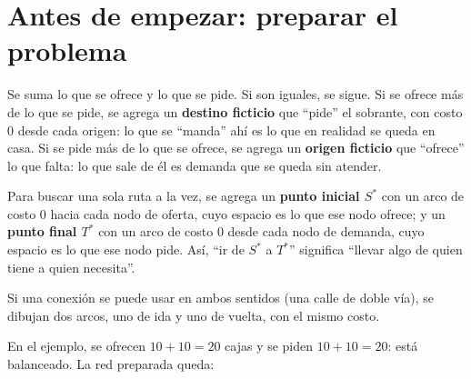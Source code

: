 \documentclass[11pt,a4paper]{article}
\newcommand{\Sini}{\ensuremath{S^{*}}}
\newcommand{\Tfin}{\ensuremath{T^{*}}}
\begin{document}
\section{Antes de empezar: preparar el problema}

\begin{description}[leftmargin=0pt, itemsep=5pt]
  \item[Revisar si está balanceado.] Se suma lo que se ofrece y lo que se pide. Si son iguales, se sigue.
        Si se ofrece más de lo que se pide, se agrega un \textbf{destino ficticio} que ``pide'' el sobrante, con costo 0
        desde cada origen: lo que se ``manda'' ahí es lo que en realidad se queda en casa. Si se pide más de lo que se
        ofrece, se agrega un \textbf{origen ficticio} que ``ofrece'' lo que falta: lo que sale de él es demanda que se
        queda sin atender.
  \item[Juntar las ofertas y las demandas.] Para buscar una sola ruta a la vez, se agrega un \textbf{punto inicial
        \Sini} con un arco de costo 0 hacia cada nodo de oferta, cuyo espacio es lo que ese nodo ofrece; y un
        \textbf{punto final \Tfin} con un arco de costo 0 desde cada nodo de demanda, cuyo espacio es lo que ese nodo
        pide. Así, ``ir de \Sini{} a \Tfin'' significa ``llevar algo de quien tiene a quien necesita''.
  \item[Arcos en los dos sentidos.] Si una conexión se puede usar en ambos sentidos (una calle de doble vía), se
        dibujan dos arcos, uno de ida y uno de vuelta, con el mismo costo.
\end{description}

En el ejemplo, se ofrecen $10 + 10 = 20$ cajas y se piden $10 + 10 = 20$: está balanceado. La red preparada queda:

\begin{center}
\end{center}
\end{document}
